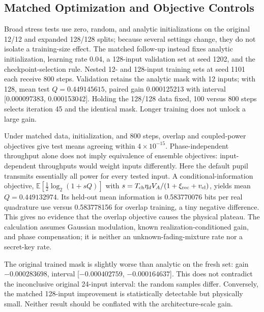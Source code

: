 \documentclass[journal]{IEEEtran}
\begin{document}
\subsection{Matched Optimization and Objective Controls}
Broad stress tests use zero, random, and analytic initializations on the original 12/12 and expanded 128/128 splits; because several settings change, they do not isolate a training-size effect. The matched follow-up instead fixes analytic initialization, learning rate 0.04, a 128-input validation set at seed 1202, and the checkpoint-selection rule. Nested 12- and 128-input training sets at seed 1101 each receive 800 steps. Validation retains the analytic mask with 12 inputs; with 128, mean test $Q=0.449145615$, paired gain 0.000125213 with interval [0.000097383, 0.000153042]. Holding the 128/128 data fixed, 100 versus 800 steps selects iteration 45 and the identical mask. Longer training does not unlock a large gain.

Under matched data, initialization, and 800 steps, overlap and coupled-power objectives give test means agreeing within $4\times10^{-15}$. Phase-independent throughput alone does not imply equivalence of ensemble objectives: input-dependent throughputs would weight inputs differently. Here the default pupil transmits essentially all power for every tested input. A conditional-information objective, $\mathbb{E}[\tfrac12\log_2(1+sQ)]$ with $s=T_{\rm ch}\eta_dV_A/(1+\xi_{\rm rec}+v_{\rm el})$, yields mean $Q=0.449132974$. Its held-out mean information is 0.583770076 bits per real quadrature use versus 0.583778156 for overlap training, a tiny negative difference. This gives no evidence that the overlap objective causes the physical plateau. The calculation assumes Gaussian modulation, known realization-conditioned gain, and phase compensation; it is neither an unknown-fading-mixture rate nor a secret-key rate.

The original trained mask is slightly worse than analytic on the fresh set: gain $-0.000283698$, interval [$-0.000402759$, $-0.000164637$]. This does not contradict the inconclusive original 24-input interval: the random samples differ. Conversely, the matched 128-input improvement is statistically detectable but physically small. Neither result should be conflated with the architecture-scale gain.
\end{document}
